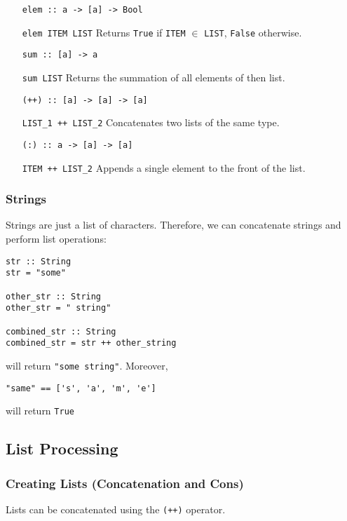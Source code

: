 \documentclass{article}
\begin{document}
\begin{enumerate}[align=left]
\item [\texttt{elem :: a -> [a] -> Bool}]
\item [\texttt{elem ITEM LIST}] Returns \texttt{True} if
  \texttt{ITEM} $\in$ \texttt{LIST}, \texttt{False} otherwise. \\
\item [\texttt{sum :: [a] -> a}]
\item [\texttt{sum LIST}] Returns the summation of all elements of then
  list. \\
\item [\texttt{(++) :: [a] -> [a] -> [a]}]
\item [\texttt{LIST\_1 ++ LIST\_2}] Concatenates two lists of the same
  type. \\
\item [\texttt{(:) :: a -> [a] -> [a]}]
\item [\texttt{ITEM ++ LIST\_2}] Appends a single element to the front
  of the list. \\
\end{enumerate}

\subsubsection{Strings}
Strings are just a list of characters. Therefore, we can concatenate
strings and perform list operations:
\begin{verbatim}
str :: String
str = "some"

other_str :: String
other_str = " string"

combined_str :: String
combined_str = str ++ other_string \end{verbatim}
will return \texttt{"some string"}. Moreover,
\begin{verbatim}
"same" == ['s', 'a', 'm', 'e']
\end{verbatim}
will return \texttt{True}

\subsection{List Processing}
\subsubsection{Creating Lists (Concatenation and Cons)} Lists can be
concatenated using the \texttt{(++)} operator. 
\end{document}
